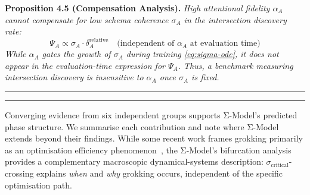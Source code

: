 \documentclass[10pt]{article}
\begin{document}
\textbf{Proposition 4.5 (Compensation Analysis).} %
\textit{High attentional fidelity $\alpha_A$ cannot compensate for low
schema coherence $\sigma_A$ in the intersection discovery rate:
\begin{equation}\label{eq:no-compensation}
\Psi_A \propto \sigma_A \cdot \delta_A^{\text{relative}} \quad \text{(independent of } \alpha_A \text{ at evaluation time)}
\end{equation}
While $\alpha_A$ gates the \textit{growth} of $\sigma_A$ during training
\eqref{eq:sigma-ode}, it does not appear in the evaluation-time
expression for $\Psi_A$. Thus, a benchmark measuring intersection discovery
is insensitive to $\alpha_A$ once $\sigma_A$ is fixed.}

\noindent\rule{\linewidth}{0.4pt}



\noindent\rule{\linewidth}{0.4pt}

Converging evidence from six independent groups supports Σ-Model's predicted phase structure. We summarise each contribution and note where Σ-Model extends beyond their findings. While some recent work frames grokking primarily as an optimisation efficiency phenomenon~\citep{liu2022grokking}, the Σ-Model's bifurcation analysis provides a complementary macroscopic dynamical-systems description: $\sigma_{\text{critical}}$-crossing explains \emph{when} and \emph{why} grokking occurs, independent of the specific optimisation path.
\end{document}

